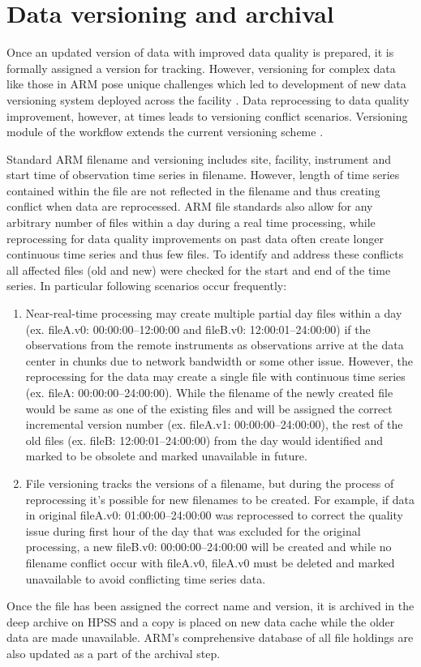 \section{Data versioning and archival}
Once an updated version of data with improved data quality is prepared,
it is formally assigned a version for tracking. However, versioning for
complex data like those in ARM pose unique challenges which led to
development of new data versioning system deployed across the facility
\cite{Macduff_2014}. Data reprocessing to data quality improvement,
however, at times leads to versioning conflict scenarios. Versioning
module of the workflow extends the current versioning scheme
\cite{Macduff_2014}.

Standard ARM filename and versioning includes site, facility, instrument
and start time of observation time series in filename. However, length
of time series contained within the file are not reflected in the
filename and thus creating conflict when data are reprocessed.
ARM file standards also allow for any arbitrary number of files within a day
during a real time processing, while reprocessing for data quality
improvements on past data often create longer continuous time series and
thus few files. To identify and address these conflicts all affected
files (old and new) were checked for the start and end of the time
series. In particular following scenarios occur frequently: 

\begin{enumerate}
 \item Near-real-time processing may create multiple partial day files
 within a day (ex. fileA.v0: 00:00:00--12:00:00 and fileB.v0:
 12:00:01--24:00:00) if the observations from the remote instruments as
 observations arrive at the data center in chunks 
 due to network bandwidth or some other issue. However, the reprocessing
 for the data may create a single file with continuous time series 
 (ex. fileA: 00:00:00--24:00:00).
 While the filename of the newly created file would be same as one of
 the existing files and will be assigned the correct incremental
 version number (ex. fileA.v1: 00:00:00--24:00:00), the rest of the 
 old files (ex. fileB: 12:00:01--24:00:00) from the day would identified
 and marked to be obsolete and marked unavailable in future.
 \item File versioning tracks the versions of a filename, but during the
 process of reprocessing it's possible for new filenames to be created.
 For example, if data in original fileA.v0: 01:00:00--24:00:00 was
 reprocessed to correct the quality issue during first hour of the day
 that was excluded for the original processing, a new fileB.v0:
 00:00:00--24:00:00 will be created and while no filename conflict occur
 with fileA.v0, fileA.v0 must be deleted and marked unavailable to avoid
 conflicting time series data.
\end{enumerate}

Once the file has been assigned the correct name and version, it is
archived in the deep archive on HPSS and a copy is placed on new data
cache while the older data are made unavailable. ARM's comprehensive
database of all file holdings are also updated as a part of the archival step.


